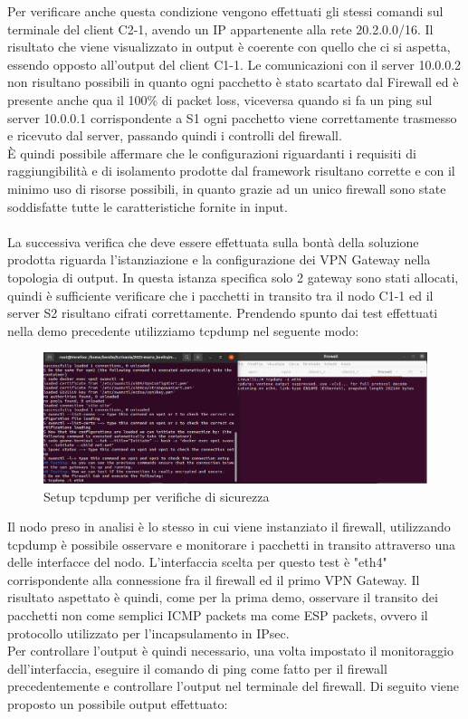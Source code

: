 Per verificare anche questa condizione vengono effettuati gli stessi comandi sul terminale del client C2-1, avendo un IP appartenente alla rete 20.2.0.0/16.
Il risultato che viene visualizzato in output è coerente con quello che ci si aspetta, essendo opposto all'output del client C1-1. Le comunicazioni con il server
10.0.0.2 non risultano possibili in quanto ogni pacchetto è stato scartato dal Firewall ed è presente anche qua il 100\% di packet loss, viceversa quando si fa un ping 
sul server 10.0.0.1 corrispondente a S1 ogni pacchetto viene correttamente trasmesso e ricevuto dal server, passando quindi i controlli del firewall. \\
È quindi possibile affermare che le configurazioni riguardanti i requisiti di raggiungibilità e di isolamento prodotte dal framework risultano corrette e con il minimo uso 
di risorse possibili, in quanto grazie ad un unico firewall sono state soddisfatte tutte le caratteristiche fornite in input. \\ \\
La successiva verifica che deve essere effettuata sulla bontà della soluzione prodotta riguarda l'istanziazione e la configurazione dei VPN Gateway nella topologia di output.
In questa istanza specifica solo 2 gateway sono stati allocati, quindi è sufficiente verificare che i pacchetti in transito tra il nodo C1-1 ed il server S2 risultano cifrati
correttamente. Prendendo spunto dai test effettuati nella demo precedente utilizziamo tcpdump nel seguente modo:

\begin{figure}[H] 
    \centering
    \includegraphics[width=1\textwidth]{(3)Firewall_tcpdump_setup.png} 
    \caption{Setup tcpdump per verifiche di sicurezza}
    \label{fig:Verifica3}
\end{figure}

Il nodo preso in analisi è lo stesso in cui viene instanziato il firewall, utilizzando tcpdump è possibile  osservare e monitorare i pacchetti in transito attraverso una delle interfacce
del nodo. L'interfaccia scelta per questo test è "eth4" corrispondente alla connessione fra il firewall ed il primo VPN Gateway. Il risultato aspettato è quindi, come per la prima demo, osservare
il transito dei pacchetti non come semplici ICMP packets ma come ESP packets, ovvero il protocollo utilizzato per l'incapsulamento in IPsec.\\
Per controllare l'output è quindi necessario, una volta impostato il monitoraggio dell'interfaccia, eseguire il comando di ping come fatto per il firewall precedentemente e controllare l'output 
nel terminale del firewall. Di seguito viene proposto un possibile output effettuato: 


